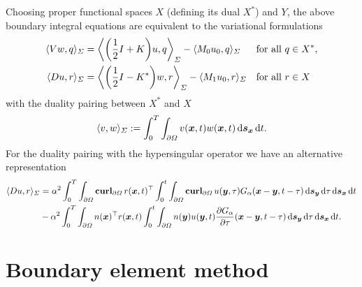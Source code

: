 \documentclass[a4paper,11pt]{article}
\begin{document}
Choosing proper functional spaces $X$ (defining its dual $X^\ast$) and $Y$, the above boundary integral equations are equivalent to the variational formulations
\begin{align}
  \label{eq:v_form}
  \langle Vw, q \rangle_\Sigma &= \bigg\langle \bigg( \frac{1}{2}I + K \bigg) u, q \bigg\rangle_\Sigma - \langle M_0 u_0, q \rangle_\Sigma &&\text{for all } q \in X^\ast,\\
  \notag
  \langle Du, r \rangle_\Sigma &= \bigg\langle \bigg( \frac{1}{2}I - K^\ast \bigg) w, r \bigg\rangle_\Sigma - \langle M_1 u_0, r \rangle_\Sigma &&\text{for all } r \in X
\end{align}
with the duality pairing between $X^\ast$ and $X$
\begin{equation*}
  \langle v, w \rangle_\Sigma := \int_0^T \int_{\partial\Omega} v({{\bm{x}}},t) w({{\bm{x}}},t) \,{\mathrm{d}}{{\bm{s}}}_{{\bm{x}}} \,{\mathrm{d}} t.
\end{equation*}
For the duality pairing with the hypersingular operator we have an alternative representation
\begin{equation}
\label{eq:D_bil}
\begin{aligned}
  \langle Du, r \rangle_\Sigma &= \alpha^2 \int_0^T \int_{\partial\Omega} \operatorname{\mathbf{curl}}_{\partial\Omega} r({{\bm{x}}},t)^\top \int_0^t \int_{\partial\Omega} \operatorname{\mathbf{curl}}_{\partial\Omega} u({{\bm{y}}},\tau) G_\alpha({{\bm{x}}}-{{\bm{y}}},t-\tau) \,{\mathrm{d}}{{\bm{s}}}_{{\bm{y}}} \,{\mathrm{d}}\tau \,{\mathrm{d}}{{\bm{s}}}_{{\bm{x}}} \,{\mathrm{d}} t \\
  &- \alpha^2 \int_0^T \int_{\partial\Omega} n({{\bm{x}}})^\top r({{\bm{x}}},t) \int_0^t \int_{\partial\Omega} n({{\bm{y}}}) u({{\bm{y}}},t) \frac{\partial G_\alpha}{\partial \tau}({{\bm{x}}}-{{\bm{y}}},t-\tau) \,{\mathrm{d}}{{\bm{s}}}_{{\bm{y}}} \,{\mathrm{d}}\tau \,{\mathrm{d}}{{\bm{s}}}_{{\bm{x}}} \,{\mathrm{d}} t.
\end{aligned}
\end{equation}

\section{Boundary element method}
\end{document}

